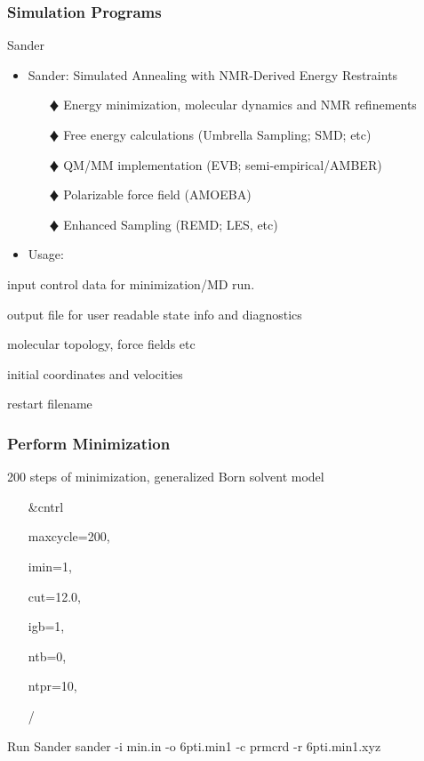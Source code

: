 \documentclass[slidestop,mathserif,compress,xcolor=svgnames]{beamer}
\newenvironment{bblock}[0]
{
\begin{beamerboxesrounded}[upper=uppercol1,lower=lowercol1,shadow=true]}
{\end{beamerboxesrounded}}
\newenvironment{eblock}[0]
{
\begin{beamerboxesrounded}[upper=uppercol2,lower=lowercol2,shadow=true]}
{\end{beamerboxesrounded}}
\begin{document}
\begin{frame}
  \frametitle{\small Simulation Programs}
  \begin{bblock}{Sander}
    \begin{itemize}
      \item Sander: Simulated Annealing with NMR-Derived Energy Restraints
      \begin{enumerate}
	\item[$\vardiamond$] Energy minimization, molecular dynamics and NMR refinements
	\item[$\vardiamond$] Free energy calculations (Umbrella Sampling; SMD; etc)
	\item[$\vardiamond$] QM/MM implementation (EVB; semi-empirical/AMBER)
	\item[$\vardiamond$] Polarizable force field (AMOEBA)
	\item[$\vardiamond$] Enhanced Sampling (REMD; LES, etc)
      \end{enumerate}
      \item Usage: 
    \end{itemize}
    \begin{description}
      {\tiny
      \item[mdin:] input control data for minimization/MD run.
      \item[mdout:] output file for user readable state info and diagnostics
      \item[prmtop:] molecular topology, force fields etc
      \item[inpcrd:] initial coordinates and velocities
      \item[restrt:] restart filename
      }
    \end{description}
  \end{bblock}
\end{frame}

\begin{frame}
  \frametitle{\small Perform Minimization}
  \begin{eblock}{200 steps of minimization, generalized Born solvent model}
    \begin{itemize}
      \item[]\&cntrl\let\thefootnote\relax{}
      \item[]maxcycle=200, 
      \item[]imin=1, 
      \item[]cut=12.0, 
      \item[]igb=1, 
      \item[]ntb=0, 
      \item[]ntpr=10,
      \item[]/
    \end{itemize}
  \end{eblock}
  \begin{eblock}{Run Sander}
    sander -i min.in -o 6pti.min1 -c prmcrd -r 6pti.min1.xyz
  \end{eblock}
\end{frame}
\end{document}
